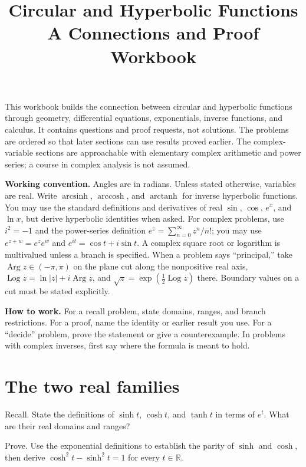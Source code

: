 \documentclass{workbook}
\title{Circular and Hyperbolic Functions\\
\large A Connections and Proof Workbook}
\author{}
\date{}
\DeclareMathOperator{\arcsinh}{arcsinh}
\DeclareMathOperator{\arccosh}{arccosh}
\DeclareMathOperator{\arctanh}{arctanh}
\newcommand{\R}{\mathbb{R}}
\begin{document}
\maketitle

\noindent
This workbook builds the connection between circular and hyperbolic functions
through geometry, differential equations, exponentials, inverse functions,
and calculus. It contains questions and proof requests, not solutions. The
problems are ordered so that later sections can use results proved earlier.
The complex-variable sections are approachable with elementary complex
arithmetic and power series; a course in complex analysis is not assumed.

\medskip\noindent
\textbf{Working convention.} Angles are in radians. Unless stated otherwise,
variables are real. Write $\arcsinh$, $\arccosh$, and $\arctanh$ for inverse
hyperbolic functions. You may use the standard definitions and derivatives of
real $\sin$, $\cos$, $e^x$, and $\ln x$, but derive hyperbolic identities when
asked. For complex problems, use $i^2=-1$ and the power-series definition
$e^z=\sum_{n=0}^{\infty}z^n/n!$; you may use $e^{z+w}=e^ze^w$ and
$e^{it}=\cos t+i\sin t$. A complex square root or logarithm is multivalued
unless a branch is specified. When a problem says ``principal,'' take
$\operatorname{Arg}z\in(-\pi,\pi)$ on the plane cut along the nonpositive
real axis, $\operatorname{Log}z=\ln|z|+i\operatorname{Arg}z$, and
$\sqrt z=\exp(\tfrac12\operatorname{Log}z)$ there. Boundary values on a cut
must be stated explicitly.

\medskip\noindent
\textbf{How to work.} For a recall problem, state domains, ranges, and branch
restrictions. For a proof, name the identity or earlier result you use. For a
``decide'' problem, prove the statement or give a counterexample. In problems
with complex inverses, first say where the formula is meant to hold.

\section{The two real families}

\begin{problem}{Recall.}
State the definitions of $\sinh t$, $\cosh t$, and $\tanh t$ in terms of
$e^t$. What are their real domains and ranges?
\end{problem}

\begin{problem}{Prove.}
Use the exponential definitions to establish the parity of $\sinh$ and
$\cosh$, then derive $\cosh^2t-\sinh^2t=1$ for every $t\in\R$.
\end{problem}
\end{document}
